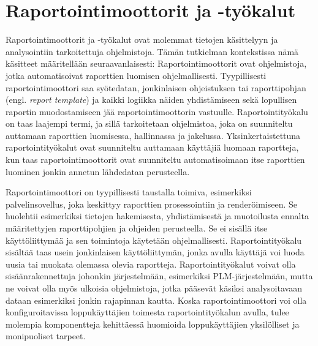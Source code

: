 \section{Raportointimoottorit ja -työkalut} \label{Raportointimoottorit ja -työkalut}

Raportointimoottorit ja -työkalut ovat molemmat tietojen käsittelyyn ja analysointiin tarkoitettuja ohjelmistoja. Tämän tutkielman kontekstissa nämä käsitteet määritellään seuraavanlaisesti: Raportointimoottorit ovat ohjelmistoja, jotka automatisoivat raporttien luomisen ohjelmallisesti. Tyypillisesti raportointimoottori saa syötedatan, jonkinlaisen ohjeistuksen tai raporttipohjan (engl. \textit{report template}) ja kaikki logiikka näiden yhdistämiseen sekä lopullisen raportin muodostamiseen jää raportointimoottorin vastuulle.  \cite{he_design_2010} Raportointityökalu on taas laajempi termi, ja sillä tarkoitetaan ohjelmistoa, joka on suunniteltu auttamaan raporttien luomisessa, hallinnassa ja jakelussa. Yksinkertaistettuna raportointityökalut ovat suunniteltu auttamaan käyttäjiä luomaan raportteja, kun taas raportointimoottorit ovat suunniteltu automatisoimaan itse raporttien luominen jonkin annetun lähdedatan perusteella.

Raportointimoottori on tyypillisesti taustalla toimiva, esimerkiksi palvelinsovellus, joka keskittyy raporttien prosessointiin ja renderöimiseen. Se huolehtii esimerkiksi tietojen hakemisesta, yhdistämisestä ja muotoilusta ennalta määritettyjen raporttipohjien ja ohjeiden perusteella. Se ei sisällä itse käyttöliittymää ja sen toimintoja käytetään ohjelmallisesti. Raportointityökalu sisältää taas usein jonkinlaisen käyttöliittymän, jonka avulla käyttäjä voi luoda uusia tai muokata olemassa olevia raportteja. Raportointityökalut voivat olla sisäänrakennettuja johonkin järjestelmään, esimerkiksi PLM-järjestelmään, mutta ne voivat olla myös ulkoisia ohjelmistoja, jotka pääsevät käsiksi analysoitavaan dataan esimerkiksi jonkin rajapinnan kautta. Koska raportointimoottori voi olla konfiguroitavissa loppukäyttäjien toimesta raportointityökalun avulla, tulee molempia komponentteja kehittäessä huomioida loppukäyttäjien yksilölliset ja monipuoliset tarpeet. \cite{adhi_performance_2019}


